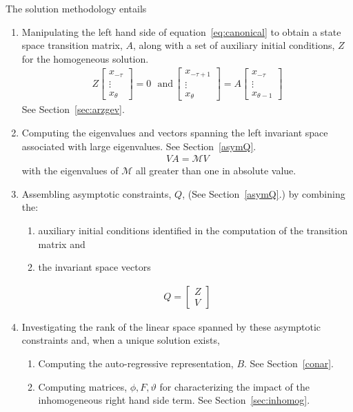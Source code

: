 \documentclass[12pt]{elsart}
\begin{document}
The solution methodology entails 
\begin{enumerate}
\item Manipulating the left hand side of equation~\ref{eq:canonical} to obtain
 a state space transition matrix, $A$, along with
a set of auxiliary initial conditions, $Z$ for the homogeneous solution.
\begin{gather}
  Z
  \begin{bmatrix}
    x_{-\tau}\\ \vdots \\ x_{\theta}
  \end{bmatrix}=0 \,\,\,\,\text{and}\,   \begin{bmatrix}
    x_{-\tau+1}\\ \vdots \\ x_{\theta}
  \end{bmatrix}
=A   \begin{bmatrix}
    x_{-\tau}\\ \vdots \\ x_{\theta-1}
  \end{bmatrix}
\end{gather}
See Section~\ref{sec:arzgev}.
\item Computing the eigenvalues and vectors spanning 
the left invariant space associated with
large eigenvalues. See Section~\ref{asymQ}.
\begin{gather}
 V A =   \mathcal{M}  V 
\end{gather}
with the eigenvalues of $ \mathcal{M}$ all greater than one in absolute value.
\item Assembling asymptotic
constraints, $Q$, (See Section~\ref{asymQ}.)  by combining the:
  \begin{enumerate}
\item  auxiliary initial conditions identified in the computation of the transition matrix and 
\item the invariant space vectors
  \end{enumerate}
\begin{gather}
  Q= 
  \begin{bmatrix}
    Z\\V
  \end{bmatrix}
\end{gather}
\item Investigating the rank of the linear space spanned by these asymptotic
constraints and,  when a unique solution exists, 
\begin{enumerate}
\item Computing the auto-regressive 
representation, $B$. See Section~\ref{conar}.
\item Computing matrices, $\phi, F, \vartheta$ 
for characterizing the impact of the inhomogeneous
right hand side term. See Section~\ref{sec:inhomog}.
\end{enumerate}
\end{enumerate}
\end{document}
